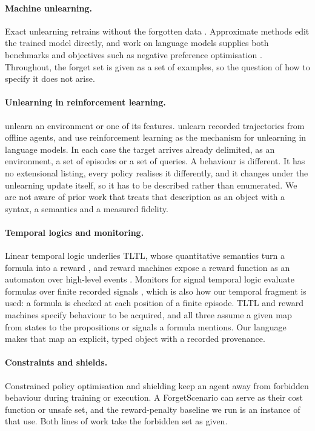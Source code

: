 \documentclass{article}
\begin{document}
\paragraph{Machine unlearning.} Exact unlearning retrains without the
forgotten data \citep{bourtoule2021machine,cao2015towards}. Approximate
methods edit the trained model directly, and work on language models
supplies both benchmarks \citep{maini2024tofu} and objectives such as
negative preference optimisation \citep{zhang2024npo}. Throughout, the
forget set is given as a set of examples, so the question of how to
specify it does not arise.

\paragraph{Unlearning in reinforcement learning.}
\citet{ye2025reinforcement} unlearn an environment or one of its features.
\citet{gong2025trajdeleter} unlearn recorded trajectories from offline
agents, and \citet{zhang2025rule} use reinforcement learning as the
mechanism for unlearning in language models. In each case the target
arrives already delimited, as an environment, a set of episodes or a set
of queries. A behaviour is different. It has no extensional listing, every
policy realises it differently, and it changes under the unlearning update
itself, so it has to be described rather than enumerated. We are not
aware of prior work that treats that description as an object with a
syntax, a semantics and a measured fidelity.

\paragraph{Temporal logics and monitoring.} Linear temporal logic
\citep{pnueli1977temporal} underlies TLTL, whose quantitative semantics
turn a formula into a reward \citep{li2017tltl}, and reward machines expose
a reward function as an automaton over high-level events
\citep{icarte2018reward}. Monitors for signal temporal logic evaluate
formulas over finite recorded signals \citep{maler2004monitoring}, which is
also how our temporal fragment is used: a formula is checked at each
position of a finite episode. TLTL and reward machines specify behaviour
to be acquired, and all three assume a given map from states to the
propositions or signals a formula mentions. Our language makes that map
an explicit, typed object with a recorded provenance.

\paragraph{Constraints and shields.} Constrained policy optimisation
\citep{achiam2017cpo} and shielding \citep{alshiekh2018shielding} keep an
agent away from forbidden behaviour during training or execution. A
ForgetScenario can serve as their cost function or unsafe set, and the
reward-penalty baseline we run is an instance of that use.
Both lines of work take the forbidden set as given.
\end{document}
